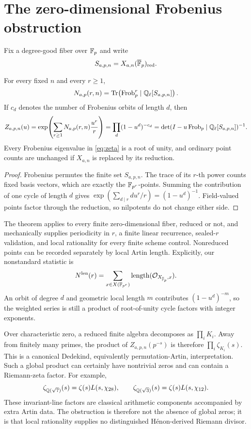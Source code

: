 \section{The zero-dimensional Frobenius obstruction}

Fix a degree-good fiber over $\mathbb F_p$ and write
\[
 S_{a,p,n}=X_{a,n}(\overline{\mathbb F}_p)_{\mathrm{red}}.
\]

\begin{theorem}\label{thm:collapse}
For every fixed $n$ and every $r\geq1$,
\begin{equation}\label{eq:trace}
 N_{a,p}(r,n)
 =\operatorname{Tr}\!\left(\operatorname{Frob}_p^r\mid\mathbb Q_\ell[S_{a,p,n}]\right).
\end{equation}
If $c_d$ denotes the number of Frobenius orbits of length $d$, then
\begin{equation}\label{eq:zeta}
 Z_{a,p,n}(u)
 =\exp\!\left(\sum_{r\geq1}N_{a,p}(r,n)\frac{u^r}{r}\right)
 =\prod_d(1-u^d)^{-c_d}
 =\det(I-u\operatorname{Frob}_p\mid\mathbb Q_\ell[S_{a,p,n}])^{-1}.
\end{equation}
Every Frobenius eigenvalue in \eqref{eq:zeta} is a root of unity, and ordinary
point counts are unchanged if $X_{a,n}$ is replaced by its reduction.
\end{theorem}

\begin{proof}
Frobenius permutes the finite set $S_{a,p,n}$.  The trace of its $r$-th power
counts fixed basis vectors, which are exactly the $\mathbb F_{p^r}$-points.  Summing
the contribution of one cycle of length $d$ gives
$\exp(\sum_{d\mid r}d u^r/r)=(1-u^d)^{-1}$.  Field-valued points factor
through the reduction, so nilpotents do not change either side.
\end{proof}

The theorem applies to every finite zero-dimensional fiber, reduced or not,
and mechanically supplies periodicity in $r$, a finite linear
recurrence, sealed-$r$ validation, and local rationality for every finite
scheme control.  Nonreduced points can be recorded separately by local Artin
length.  Explicitly, our nonstandard statistic is
\[
 N^{\mathrm{len}}(r)=
 \sum_{x\in X(\mathbb F_{p^r})}
 \operatorname{length}(\mathcal O_{X_{\overline{\mathbb F}_p},x}).
\]
An orbit of degree $d$ and geometric local length $m$ contributes
$(1-u^d)^{-m}$, so the weighted series is still a product of root-of-unity
cycle factors with integer exponents.

Over characteristic zero, a reduced finite algebra decomposes as
$\prod_i K_i$.  Away from finitely many primes, the product of
$Z_{a,p,n}(p^{-s})$ is therefore $\prod_i\zeta_{K_i}(s)$.  This is a canonical
Dedekind, equivalently permutation-Artin, interpretation.  Such a global
product can certainly have nontrivial zeros and can contain a Riemann-zeta
factor.  For example,
\[
 \zeta_{\mathbb Q(\sqrt7)}(s)=\zeta(s)L(s,\chi_{28}),\qquad
 \zeta_{\mathbb Q(\sqrt3)}(s)=\zeta(s)L(s,\chi_{12}).
\]
These invariant-line factors are classical arithmetic components accompanied
by extra Artin data.  The obstruction is therefore not the absence of global
zeros; it is that local rationality supplies no distinguished
H\'enon-derived Riemann divisor.

